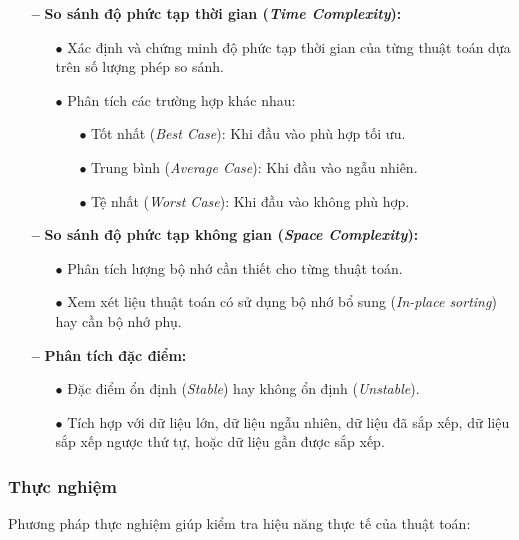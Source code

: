 \begin{itemize}
    \item [\textbf{--}] \textbf{So sánh độ phức tạp thời gian (\textit{Time Complexity}):}
    \begin{itemize}
        \item [$\bullet$]Xác định và chứng minh độ phức tạp thời gian của từng thuật toán dựa trên số lượng phép so sánh.
        \item [$\bullet$]Phân tích các trường hợp khác nhau:
        \begin{itemize}
            \item [$\bullet$] Tốt nhất (\textit{Best Case}): Khi đầu vào phù hợp tối ưu.
            \item [$\bullet$] Trung bình (\textit{Average Case}): Khi đầu vào ngẫu nhiên.
            \item [$\bullet$] Tệ nhất (\textit{Worst Case}): Khi đầu vào không phù hợp.
        \end{itemize}
    \end{itemize}
    
    \item [\textbf{--}] \textbf{So sánh độ phức tạp không gian (\textit{Space Complexity}):}
    \begin{itemize}
        \item [$\bullet$] Phân tích lượng bộ nhớ cần thiết cho từng thuật toán.
        \item [$\bullet$] Xem xét liệu thuật toán có sử dụng bộ nhớ bổ sung (\textit{In-place sorting}) hay cần bộ nhớ phụ.
    \end{itemize}
    
    \item [\textbf{--}] \textbf{Phân tích đặc điểm:}
    \begin{itemize}
        \item [$\bullet$] Đặc điểm ổn định (\textit{Stable}) hay không ổn định (\textit{Unstable}).
        \item [$\bullet$] Tích hợp với dữ liệu lớn, dữ liệu ngẫu nhiên, dữ liệu đã sắp xếp, dữ liệu sắp xếp ngược thứ tự, hoặc dữ liệu gần được sắp xếp.
    \end{itemize}
\end{itemize}

\subsubsection{Thực nghiệm}
Phương pháp thực nghiệm giúp kiểm tra hiệu năng thực tế của thuật toán:

